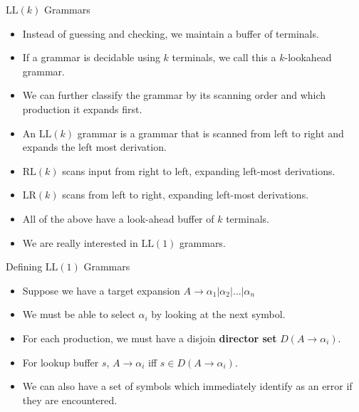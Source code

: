 \documentclass[]{beamer}
\begin{document}
\begin{frame}{$\mathrm{LL}(k)$ Grammars}
  \begin{itemize}[<+->]
    \item Instead of guessing and checking, we maintain a buffer of terminals.
    \item If a grammar is decidable using $k$ terminals, we call this a $k$-lookahead grammar.
    \item We can further classify the grammar by its scanning order and which production it expands first.
    \item An $\mathrm{LL}(k)$ grammar is a grammar that is scanned from left to right and expands the left most derivation.
    \item $\mathrm{RL}(k)$ scans input from right to left, expanding left-most derivations.
    \item $\mathrm{LR}(k)$ scans from left to right, expanding left-most derivations.
    \item All of the above have a look-ahead buffer of $k$ terminals.
    \item We are really interested in $\mathrm{LL}(1)$ grammars.
  \end{itemize}
\end{frame}

\begin{frame}{Defining $\mathrm{LL}(1)$ Grammars}
  \begin{itemize}[<+->]
      \item Suppose we have a target expansion $A \rightarrow \alpha_1 | \alpha_2 | \ldots | \alpha_n$
      \item We must be able to select $\alpha_i$ by looking at the next symbol.
      \item For each production, we must have a disjoin \textbf{director set} $D(A\rightarrow \alpha_i)$.
      \item For lookup buffer $s$, $A \rightarrow \alpha_i$ iff $s \in D(A \rightarrow \alpha_i)$.
      \item We can also have a set of symbols which immediately identify as an error if they are encountered.
  \end{itemize}
\end{frame}
\end{document}
